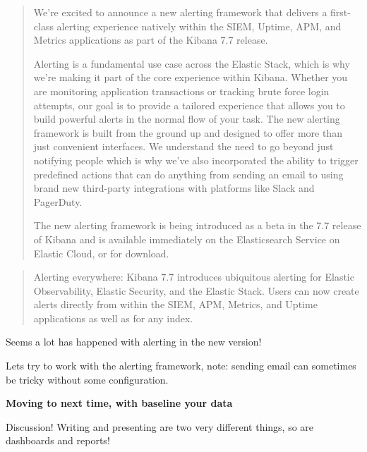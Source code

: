 \documentclass[Screen16to9,17pt]{foils}
\begin{document}

\begin{quote}\small
We’re excited to announce a new alerting framework that delivers a first-class alerting experience natively within the SIEM, Uptime, APM, and Metrics applications as part of the Kibana 7.7 release.

Alerting is a fundamental use case across the Elastic Stack, which is why we’re making it part of the core experience within Kibana. Whether you are monitoring application transactions or tracking brute force login attempts, our goal is to provide a tailored experience that allows you to build powerful alerts in the normal flow of your task. The new alerting framework is built from the ground up and designed to offer more than just convenient interfaces. We understand the need to go beyond just notifying people which is why we’ve also incorporated the ability to trigger predefined actions that can do anything from sending an email to using brand new third-party integrations with platforms like Slack and PagerDuty.

The new alerting framework is being introduced as a beta in the 7.7 release of Kibana and is available immediately on the Elasticsearch Service on Elastic Cloud, or for download.
\end{quote}

\begin{list2}
\item{}
\item {}
\item {}
\item {}
\end{list2}




\begin{quote}
Alerting everywhere: Kibana 7.7 introduces ubiquitous alerting for Elastic Observability, Elastic Security, and the Elastic Stack. Users can now create alerts directly from within the SIEM, APM, Metrics, and Uptime applications as well as for any index.
\end{quote}

\begin{list2}
\item Seems a lot has happened with alerting in the new version!
\item Lets try to work with the alerting framework, note: sending email can sometimes be tricky without some configuration.
\end{list2}



\centerline{\bf\Large Moving to next time, with baseline your data}

Discussion! Writing and presenting are two very different things, so are dashboards and reports!

\slidenext{}
\end{document}
